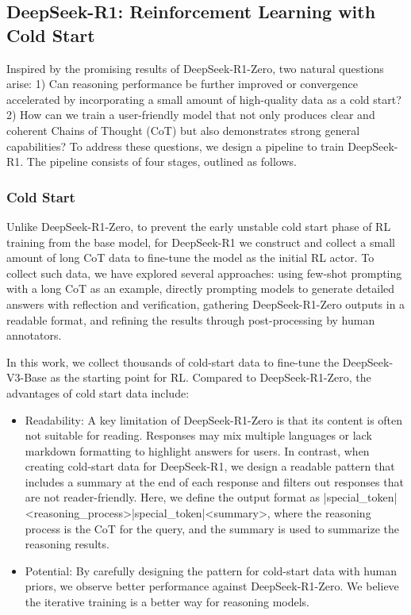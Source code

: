 \documentclass[11pt, a4paper, logo, copyright, nonumbering]{deepseek}
\newcommand{\dsri}{DeepSeek-R1}
\newcommand{\dsro}{DeepSeek-R1-Zero}
\begin{document}
\subsection{\dsri{}: Reinforcement Learning with Cold Start}
Inspired by the promising results of \dsro{}, two natural questions arise: 1) Can reasoning performance be further improved or convergence accelerated by incorporating a small amount of high-quality data as a cold start? 2) How can we train a user-friendly model that not only produces clear and coherent Chains of Thought (CoT) but also demonstrates strong general capabilities?
To address these questions, we design a pipeline to train \dsri{}. The pipeline consists of four stages, outlined as follows.


\subsubsection{Cold Start}
Unlike \dsro{}, to prevent the early unstable cold start phase of RL training from the base model, for DeepSeek-R1 we construct and collect a small amount of long CoT data to fine-tune the model as the initial RL actor.
To collect such data, we have explored several approaches: using few-shot prompting with a long CoT as an example, directly prompting models to generate detailed answers with reflection and verification, gathering \dsro{} outputs in a readable format, and refining the results through post-processing by human annotators.


In this work, we collect thousands of cold-start data to fine-tune the DeepSeek-V3-Base as the starting point for RL.
Compared to \dsro{}, the advantages of cold start data include:
\begin{itemize}[topsep=0pt]
    \item 
Readability: A key limitation of \dsro{} is that its content is often not suitable for reading. Responses may mix multiple languages or lack markdown formatting to highlight answers for users. In contrast, when creating cold-start data for \dsri{}, we design a readable pattern that includes a summary at the end of each response and filters out responses that are not reader-friendly. Here, we define the output format as |special\_token|<reasoning\_process>|special\_token|<summary>, where the reasoning process is the CoT for the query, and the summary is used to summarize the reasoning results. 

 \item 
Potential: By carefully designing the pattern for cold-start data with human priors, we observe better performance against \dsro{}. We believe the iterative training is a better way for reasoning models. 
\end{itemize}
\end{document}
